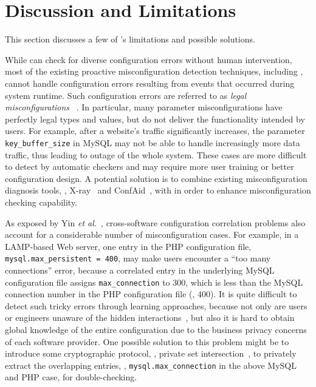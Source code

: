 
\section{Discussion and Limitations}

This section discusses a few of \app's limitations
and possible solutions.

While \app can check for diverse configuration errors without
human intervention, most of the existing proactive 
misconfiguration detection techniques,
including \app, cannot handle configuration errors
resulting from events that occurred during system runtime.
Such configuration errors are referred to as {\em legal misconfigurations}%
~\cite{yin11anempirical}. In particular, 
many parameter misconfigurations have 
perfectly legal types and values, 
but do not deliver the functionality intended by users. 
For example, after a website's traffic significantly increases,
the parameter {\tt key\_buffer\_size} in MySQL may not 
be able to handle increasingly more data traffic,
thus leading to outage of the whole system.
These cases are more difficult to detect by
automatic checkers and may require more user training or
better configuration design.
A potential solution is to combine existing misconfiguration diagnosis
tools, \eg, X-ray~\cite{attariyan12x-ray} 
and ConfAid~\cite{attariyan10automating},
with \app in order to enhance 
misconfiguration checking capability.

As exposed by Yin {\em et al.}~\cite{yin11anempirical},
cross-software configuration correlation problems also account
for a considerable number of misconfiguration cases.
For example, in a LAMP-based Web server, one entry in the
PHP configuration file, {\tt mysql.max\_persistent = 400},
may make users encounter a ``too many connections'' error,
because a correlated entry in the underlying MySQL configuration
file assigns {\tt max\_connection} to 300, which is less
than the MySQL connection number in the PHP configuration file (\ie, 400).
It is quite difficult to detect such tricky errors
through learning approaches, because not only are users or engineers 
unaware of the hidden interactions~\cite{xu15systems},
but also it is hard to obtain global knowledge of the entire
configuration due to the business privacy concerns of
each software provider.
One possible solution to this problem might be to introduce
some cryptographic protocol, \eg, private set
intersection~\cite{kissner05privacy}, to privately extract the
overlapping entries, \eg, {\tt mysql.max\_connection} in the 
above MySQL and PHP case, for double-checking.

